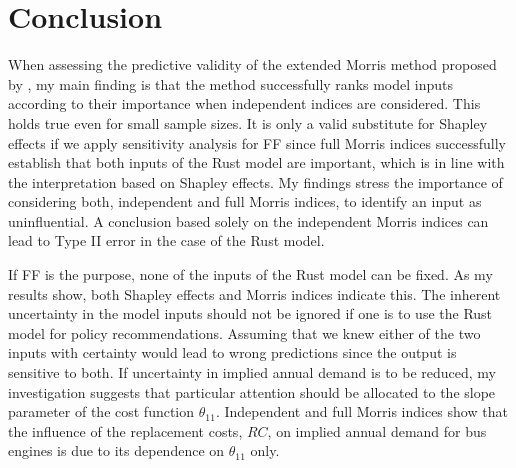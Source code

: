 \section{Conclusion} \label{conclusion}



When assessing the predictive validity of the extended Morris method proposed by \citet{GM17}, my main finding is that the method successfully ranks model inputs according to their importance when independent indices are considered. This holds true even for small sample sizes. It is only a valid substitute for Shapley effects if we apply sensitivity analysis for FF since full Morris indices successfully establish that both inputs of the Rust model are important, which is in line with the interpretation based on Shapley effects. My findings stress the importance of considering both, independent and full Morris indices, to identify an input as uninfluential. A conclusion based solely on the independent Morris indices can lead to Type II error in the case of the Rust model.


If FF is the purpose, none of the inputs of the Rust model can be fixed. As my results show, both Shapley effects and Morris indices indicate this. The inherent uncertainty in the model inputs should not be ignored if one is to use the Rust model for policy recommendations. Assuming that we knew either of the two inputs with certainty would lead to wrong predictions since the output is sensitive to both. If uncertainty in implied annual demand is to be reduced, my investigation suggests that particular attention should be allocated to the slope parameter of the cost function $\theta_{11}$. Independent and full Morris indices show that the influence of the replacement costs, $RC$, on implied annual demand for bus engines is due to its dependence on $\theta_{11}$ only.

